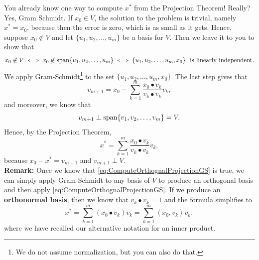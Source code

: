 You already know one way to compute $x^\ast$ from the Projection Theorem! Really? Yes, Gram Schmidt. If $x_0 \in V$, the solution to the problem is trivial, namely $x^\ast = x_0$, because then the error is zero, which is as small as it gets. Hence, suppose $x_0\not \in V$ and let $\{u_1, u_2, \ldots, u_m \}$ be a basis for $V$. Then we leave it to you to show that
$$ x_0 \not \in V \iff x_0 \not \in \mathrm{span} \{ u_1, u_2, \ldots, u_m  \} \iff \{u_1, u_2, \ldots, u_m, x_0\}~~\text{is linearly independent}.$$
We apply Gram-Schmidt\footnote{We do not assume normalization, but you can also do that.} to the set $\{u_1, u_2, \ldots, u_m, x_0\}$. The last step gives that
$$v_{m+1} = x_0 -\sum_{k=1}^m \frac{x_0 \bullet v_k}{v_k \bullet v_k}v_k,$$
and moreover, we know that 
$$v_{m+1} \perp \mathrm{span} \{ v_1, v_2, \ldots, v_m \} =V.$$
Hence, by the Projection Theorem, 
\begin{equation}
\label{eq:ComputeOrthognalProjectionGS}
 \boxed{x^\ast =  \sum_{k=1}^m \frac{x_0 \bullet v_k}{v_k \bullet v_k}v_k,} 
\end{equation}
because $ x_0 - x^\ast = v_{m+1}$ and $v_{m+1} \perp V$.\\

\textbf{Remark:} Once we know that \eqref{eq:ComputeOrthognalProjectionGS} is true, we can simply apply Gram-Schmidt to any basis of $V$ to produce an orthogonal basis and then apply  \eqref{eq:ComputeOrthognalProjectionGS}. If we produce an \textbf{orthonormal basis}, then we know that $v_k \bullet v_k=1$ and the formula simplifies to 
\begin{equation}
\label{eq:ComputeOrthognalProjectionGS02}
\boxed{x^\ast = \sum_{k=1}^m \left(x_0 \bullet v_k \right) v_k =  \sum_{k=1}^m \left< x_0 ,  v_k \right> v_k,}  
\end{equation}
where we have recalled our alternative notation for an inner product.\\

